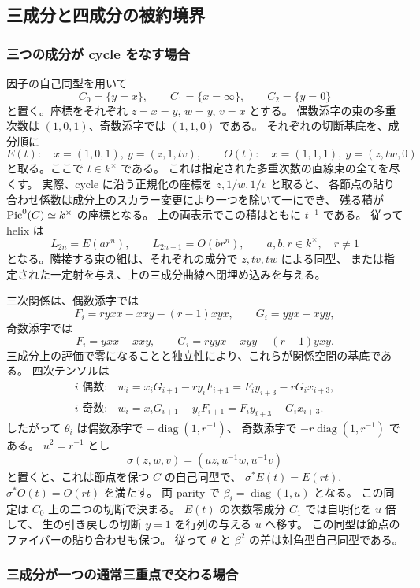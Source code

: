 \subsection{三成分と四成分の被約境界}

\subsubsection{三つの成分が cycle をなす場合}

因子の自己同型を用いて
\[
 C_0=\{y=x\},\qquad C_1=\{x=\infty\},\qquad C_2=\{y=0\}
\]
と置く。座標をそれぞれ $z=x=y$, $w=y$, $v=x$ とする。
偶数添字の束の多重次数は $(1,0,1)$、奇数添字では $(1,1,0)$ である。
それぞれの切断基底を、成分順に
\[
 E(t):\quad x=(1,0,1),\ y=(z,1,tv),
 \qquad
 O(t):\quad x=(1,1,1),\ y=(z,tw,0)
\]
と取る。ここで $t\in k^\times$ である。
これは指定された多重次数の直線束の全てを尽くす。
実際、cycle に沿う正規化の座標を $z,1/w,1/v$ と取ると、
各節点の貼り合わせ係数は成分上のスカラー変更により一つを除いて一にでき、
残る積が $\operatorname{Pic}^0(C)\simeq k^\times$ の座標となる。
上の両表示でこの積はともに $t^{-1}$ である。
従って helix は
\[
 L_{2n}=E(ar^n),\qquad L_{2n+1}=O(br^n),
 \qquad a,b,r\in k^\times,\quad r\ne1
\]
となる。隣接する束の組は、それぞれの成分で $z,tv,tw$ による同型、
または指定された一定射を与え、上の三成分曲線へ閉埋め込みを与える。

三次関係は、偶数添字では
\[
 F_i=ryxx-xxy-(r-1)xyx,\qquad G_i=yyx-xyy,
\]
奇数添字では
\[
 F_i=yxx-xxy,\qquad G_i=ryyx-xyy-(r-1)yxy.
\]
三成分上の評価で零になることと独立性により、これらが関係空間の基底である。
四次テンソルは
\[
 \begin{array}{ll}
 i\text{ 偶数}:&w_i=x_iG_{i+1}-r y_iF_{i+1}
                     =F_i y_{i+3}-rG_i x_{i+3},\\
 i\text{ 奇数}:&w_i=x_iG_{i+1}-y_iF_{i+1}
                     =F_i y_{i+3}-G_i x_{i+3}.
 \end{array}
\]
したがって $\theta_i$ は偶数添字で $-\operatorname{diag}(1,r^{-1})$、
奇数添字で $-r\operatorname{diag}(1,r^{-1})$ である。
$u^2=r^{-1}$ とし
\[
 \sigma(z,w,v)=(uz,u^{-1}w,u^{-1}v)
\]
と置くと、これは節点を保つ $C$ の自己同型で、
$\sigma^*E(t)=E(rt)$, $\sigma^*O(t)=O(rt)$ を満たす。
両 parity で $\beta_i=\operatorname{diag}(1,u)$ となる。
この同定は $C_0$ 上の二つの切断で決まる。
$E(t)$ の次数零成分 $C_1$ では自明化を $u$ 倍して、
生の引き戻しの切断 $y=1$ を行列の与える $u$ へ移す。
この同型は節点のファイバーの貼り合わせも保つ。
従って $\theta$ と $\beta^2$ の差は対角型自己同型である。

\subsubsection{三成分が一つの通常三重点で交わる場合}

